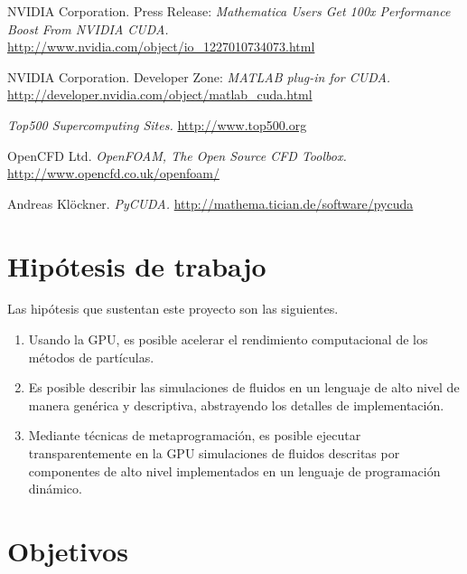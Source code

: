 \documentclass[11pt,spanish]{article}
\newcommand{\reftitle}{\textit}
\begin{document}
\begin{thebibliography}{99}
    NVIDIA Corporation.  Press Release:
    \reftitle{Mathematica Users Get 100x Performance Boost From NVIDIA CUDA.}
    \url{http://www.nvidia.com/object/io_1227010734073.html}

    NVIDIA Corporation.  Developer Zone:
    \reftitle{MATLAB plug-in for CUDA.}
    \url{http://developer.nvidia.com/object/matlab_cuda.html}

    \reftitle{Top500 Supercomputing Sites.}
    \url{http://www.top500.org}

    OpenCFD Ltd.
    \reftitle{OpenFOAM, The Open Source CFD Toolbox.}
    \url{http://www.opencfd.co.uk/openfoam/}

    Andreas Klöckner.
    \reftitle{PyCUDA.}
    \url{http://mathema.tician.de/software/pycuda}


\end{thebibliography}

\newpage
\section{Hipótesis de trabajo}
Las hipótesis que sustentan este proyecto son las siguientes.
\begin{enumerate}
    \item Usando la GPU, es posible acelerar el rendimiento computacional de los
        métodos de partículas.
    \item Es posible describir las simulaciones de fluidos en un lenguaje de
        alto nivel de manera genérica y descriptiva, abstrayendo los detalles de
        implementación.
    \item Mediante técnicas de metaprogramación, es posible ejecutar
        transparentemente en la GPU simulaciones de fluidos descritas por
        componentes de alto nivel implementados en un lenguaje de programación
        dinámico.
\end{enumerate}

\section{Objetivos }
\end{document}
